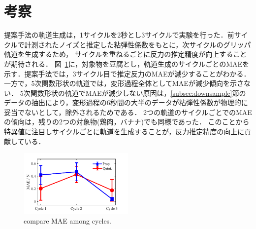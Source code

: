 \documentclass[a4paper]{jarticle}
\begin{document}
\section{考察}
提案手法の軌道生成は，1サイクルを2秒とし3サイクルで実験を行った．前サイクルで計測されたノイズと推定した粘弾性係数をもとに，次サイクルのグリッパ軌道を生成するため，
サイクルを重ねるごとに反力の推定精度が向上することが期待される．
図~\ref{fig:compare_cycle_MAE}に，対象物を豆腐とし，軌道生成のサイクルごとのMAEを示す．提案手法では，3サイクル目で推定反力のMAEが減少することがわかる．
一方で，5次関数形状の軌道では，変形過程全体としてMAEが減少傾向を示さない．
5次関数形状の軌道でMAEが減少しない原因は，\ref{subsec:downsample}節のデータの抽出により，変形過程の6秒間の大半のデータが粘弾性係数が物理的に妥当でないとして，除外されるためである．
2つの軌道のサイクルごとでのMAEの傾向は，残りの2つの対象物(鶏肉，バナナ)でも同様であった．
このことから特異値に注目しサイクルごとに軌道を生成することが，反力推定精度の向上に貢献している．
\begin{figure}[t]
    \centering
    \includegraphics[width=0.5\textwidth]{chikencompare_cycle_MAE.pdf}
    \caption{compare MAE among cycles.}
    \label{fig:compare_cycle_MAE}
\end{figure}
\end{document}
